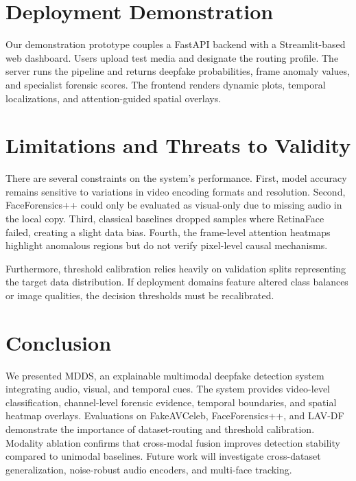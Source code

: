 \documentclass[conference]{IEEEtran}
\begin{document}
\section{Deployment Demonstration}
Our demonstration prototype couples a FastAPI backend with a Streamlit-based web dashboard. Users upload test media and designate the routing profile. The server runs the pipeline and returns deepfake probabilities, frame anomaly values, and specialist forensic scores. The frontend renders dynamic plots, temporal localizations, and attention-guided spatial overlays.

\section{Limitations and Threats to Validity}
There are several constraints on the system's performance. First, model accuracy remains sensitive to variations in video encoding formats and resolution. Second, FaceForensics++ could only be evaluated as visual-only due to missing audio in the local copy. Third, classical baselines dropped samples where RetinaFace failed, creating a slight data bias. Fourth, the frame-level attention heatmaps highlight anomalous regions but do not verify pixel-level causal mechanisms.

Furthermore, threshold calibration relies heavily on validation splits representing the target data distribution. If deployment domains feature altered class balances or image qualities, the decision thresholds must be recalibrated.

\section{Conclusion}
We presented MDDS, an explainable multimodal deepfake detection system integrating audio, visual, and temporal cues. The system provides video-level classification, channel-level forensic evidence, temporal boundaries, and spatial heatmap overlays. Evaluations on FakeAVCeleb, FaceForensics++, and LAV-DF demonstrate the importance of dataset-routing and threshold calibration. Modality ablation confirms that cross-modal fusion improves detection stability compared to unimodal baselines. Future work will investigate cross-dataset generalization, noise-robust audio encoders, and multi-face tracking.



\end{document}
